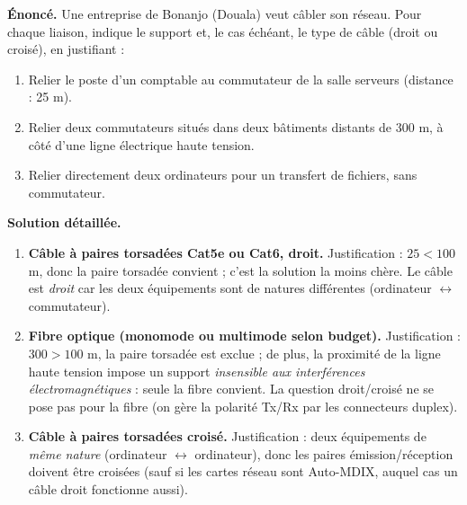 \documentclass[11pt]{article}
\begin{document}
\begin{exoresolu}
\textbf{Énoncé.} Une entreprise de Bonanjo (Douala) veut câbler son réseau. Pour chaque liaison, indique le support et, le cas échéant, le type de câble (droit ou croisé), en justifiant :
\begin{enumerate}
  \item Relier le poste d'un comptable au commutateur de la salle serveurs (distance : 25 m).
  \item Relier deux commutateurs situés dans deux bâtiments distants de 300 m, à côté d'une ligne électrique haute tension.
  \item Relier directement deux ordinateurs pour un transfert de fichiers, sans commutateur.
\end{enumerate}
\tcblower
\textbf{Solution détaillée.}
\begin{enumerate}
  \item \textbf{Câble à paires torsadées Cat5e ou Cat6, droit.} Justification : $25 < 100$ m, donc la paire torsadée convient ; c'est la solution la moins chère. Le câble est \emph{droit} car les deux équipements sont de natures différentes (ordinateur $\leftrightarrow$ commutateur).
  \item \textbf{Fibre optique (monomode ou multimode selon budget).} Justification : $300 > 100$ m, la paire torsadée est exclue ; de plus, la proximité de la ligne haute tension impose un support \emph{insensible aux interférences électromagnétiques} : seule la fibre convient. La question droit/croisé ne se pose pas pour la fibre (on gère la polarité Tx/Rx par les connecteurs duplex).
  \item \textbf{Câble à paires torsadées croisé.} Justification : deux équipements de \emph{même nature} (ordinateur $\leftrightarrow$ ordinateur), donc les paires émission/réception doivent être croisées (sauf si les cartes réseau sont Auto-MDIX, auquel cas un câble droit fonctionne aussi).
\end{enumerate}
\end{exoresolu}
\end{document}
